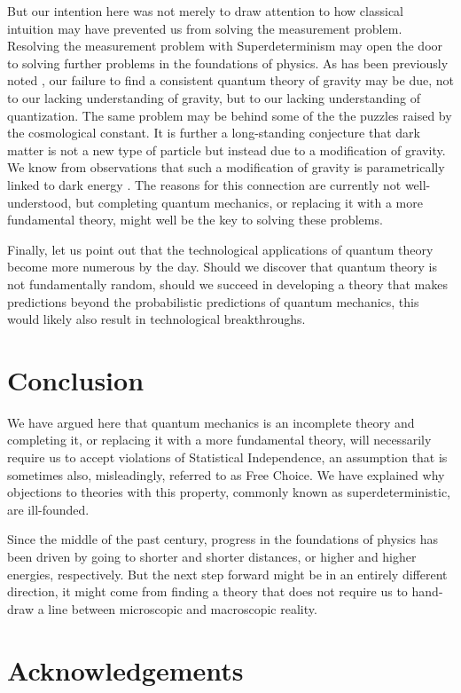 \documentclass[12pt]{article}
\begin{document}
But our intention here was not merely to draw attention to how classical intuition may have prevented us from solving the measurement problem. Resolving the measurement problem with Superdeterminism may open the door to solving further problems in the foundations of physics. As has been previously noted \cite{Hossenfelder:2012uy}, our failure to find a consistent quantum theory of gravity may be due, not to our lacking understanding of gravity, but to our lacking understanding of quantization. The same problem may be behind some of the the puzzles raised by the cosmological constant. It is further a long-standing conjecture that dark matter is not a new type of particle but instead due to a modification of gravity. We know from observations that such a modification of gravity is parametrically linked to dark energy \cite{one}. The reasons for this connection are currently not well-understood, but completing quantum mechanics, or replacing it with a more fundamental theory, might well be the key to solving these problems.

Finally, let us point out that the technological applications of quantum theory become more numerous by the day. Should we discover that quantum theory is not fundamentally random, should we succeed in developing a theory that makes predictions beyond the probabilistic predictions of quantum mechanics, this would likely also result in technological breakthroughs. 

\section{Conclusion}

We have argued here that quantum mechanics is an incomplete theory and completing it, or replacing it with a more fundamental theory, will necessarily require us to accept violations of Statistical Independence, an assumption that is sometimes also, misleadingly, referred to as Free Choice. We have explained why objections to theories with this property, commonly known as superdeterministic, are ill-founded. 

Since the middle of the past century, progress in the foundations of physics has been driven by going to shorter and shorter distances, or higher and higher energies, respectively. But the next step forward might be in an entirely different direction, it might come from finding a theory that does not require us to hand-draw a line between microscopic and macroscopic reality.

\section*{Acknowledgements}
\end{document}
